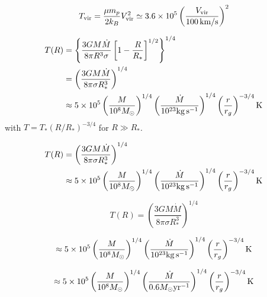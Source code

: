 \documentclass[11pt,a4paper]{article}
\begin{document}
\normalsize  
\begin{equation}
T_{\rm vir} = \frac{\mu m_{p}}{2 k_{B}} V^{2}_{\rm vir} \simeq 3.6\times10^{5} \left ( \frac{V_{\rm vir}} {100\, {\rm km/s}} \right )^{2}
\end{equation}

\newpage

\begin{align}
T(R) &= {\left \{   \frac{3 GM \dot{M}} {8 \pi R^{3} \sigma} \left [  1 -\frac{R}{R_{*}} \right ]^{1/2}   \right \}}^{1/4} \\
   & = \left ( \frac{3 G M \dot{M}}{8 \pi \sigma R^{3}_{*}}  \right )^{1/4} \\
& \approx 5 \times 10^{5}    \left(   \frac{M}{10^{8} M_{\odot}}   \right  )^{1/4}  \left(  \frac{\dot{M}}{10^{23} {\rm kg\, s^{-1}}}  \right )^{1/4} \left ( \frac{r}{r_{g}} \right )^{-3/4}  {\rm K} \\
\end{align}
with $T = T_{*} (R/R_{*})^{-3/4}$ for $R \gg R_{*}$. 

\begin{align}
T(R) &= \left ( \frac{3 G M \dot{M}}{8 \pi \sigma R^{3}_{*}}  \right )^{1/4} \\
      & \approx 5 \times 10^{5}    \left(   \frac{M}{10^{8} M_{\odot}}   \right  )^{1/4}  \left(  \frac{\dot{M}}{10^{23} {\rm kg\, s^{-1}}}  \right )^{1/4} \left ( \frac{r}{r_{g}} \right )^{-3/4}  {\rm K} \\
\end{align}

\begin{equation}
T(R) = \left ( \frac{3 G M \dot{M}}{8 \pi \sigma R^{3}_{*}}  \right )^{1/4} 
\end{equation}

\begin{equation}
  \approx 5 \times 10^{5}    \left(   \frac{M}{10^{8} M_{\odot}}   \right  )^{1/4}  \left(  \frac{\dot{M}}{10^{23} {\rm kg\, s^{-1}}}  \right )^{1/4} \left ( \frac{r}{r_{g}} \right )^{-3/4}  {\rm K} \\
\end{equation}

\begin{equation}
  \approx 5 \times 10^{5}    \left(   \frac{M}{10^{8} M_{\odot}}   \right  )^{1/4}  \left(  \frac{\dot{M}}{0.6 M_{\odot} {\rm yr^{-1}}}  \right )^{1/4} \left ( \frac{r}{r_{g}} \right )^{-3/4}  {\rm K} \\
\end{equation}
\end{document}
